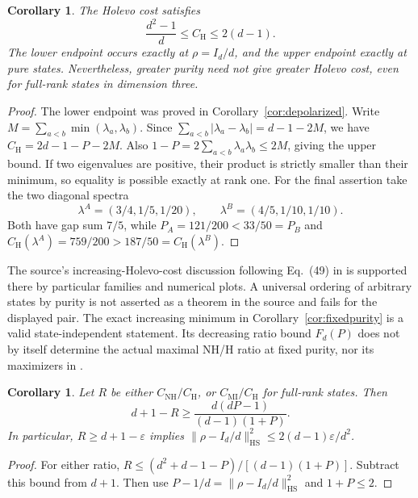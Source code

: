 \documentclass[11pt]{article}
\newcommand{\Id}{I}
\newcommand{\CH}{C_{\mathrm H}}
\newcommand{\CN}{C_{\mathrm{NH}}}
\newcommand{\CM}{C_{\mathrm{MI}}}
\newtheorem{corollary}[theorem]{Corollary}
\begin{document}
\begin{corollary}\label{cor:range}
The Holevo cost satisfies
\[
 \frac{d^2-1}{d}\leq\CH\leq2(d-1).
\]
The lower endpoint occurs exactly at $\rho=\Id_d/d$, and the upper endpoint
exactly at pure states. Nevertheless, greater purity need not give greater
Holevo cost, even for full-rank states in dimension three.
\end{corollary}
\begin{proof}
The lower endpoint was proved in Corollary~\ref{cor:depolarized}.
Write $M=\sum_{a<b}\min(\lambda_a,\lambda_b)$.
Since $\sum_{a<b}|\lambda_a-\lambda_b|=d-1-2M$, we have
$\CH=2d-1-P-2M$.
Also $1-P=2\sum_{a<b}\lambda_a\lambda_b\leq2M$, giving the upper bound.
If two eigenvalues are positive, their product is strictly smaller than
their minimum, so equality is possible exactly at rank one.
For the final assertion take the two diagonal spectra
\[
 \lambda^{A}=(3/4,1/5,1/20),\qquad
 \lambda^{B}=(4/5,1/10,1/10).
\]
Both have gap sum $7/5$, while
$P_A=121/200<33/50=P_B$ and
$\CH(\lambda^A)=759/200>187/50=\CH(\lambda^B)$.
\end{proof}

The source's increasing-Holevo-cost discussion following Eq.~(49) in
\cite[Sec.~5.4]{Das} is supported there by particular families and numerical
plots. A universal ordering of arbitrary states by purity is not asserted
as a theorem in the source and fails for the displayed pair.
The exact increasing minimum in Corollary~\ref{cor:fixedpurity}
is a valid state-independent statement. Its decreasing ratio bound $F_d(P)$ does not by
itself determine the actual maximal NH/H ratio at fixed purity, nor its
maximizers in \cite[Sec.~3.3, Fig.~3]{Das}.

\begin{corollary}\label{cor:stability}
Let $R$ be either $\CN/\CH$, or $\CM/\CH$ for full-rank states. Then
\[
 d+1-R\geq\frac{d(dP-1)}{(d-1)(1+P)}.
\]
In particular, $R\geq d+1-\varepsilon$ implies
$\|\rho-\Id_d/d\|_{\mathrm{HS}}^2\leq2(d-1)\varepsilon/d^2$.
\end{corollary}
\begin{proof}
For either ratio, $R\leq(d^2+d-1-P)/[(d-1)(1+P)]$.
Subtract this bound from $d+1$.
Then use $P-1/d=\|\rho-\Id_d/d\|_{\mathrm{HS}}^2$ and $1+P\leq2$.
\end{proof}
\end{document}
